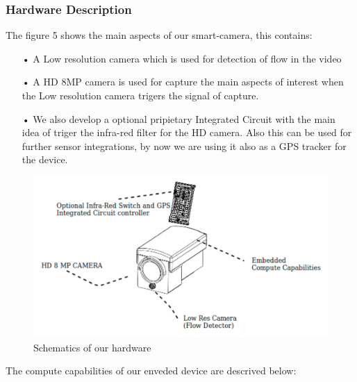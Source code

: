 \subsubsection{Hardware Description}

The figure 5 shows the main aspects of our smart-camera, this contains:
\begin{itemize}
\item[•] A Low resolution camera which is used for detection of flow in the video
\item[•] A HD 8MP camera is used for capture the main aspects of interest when the Low resolution camera trigers the signal of capture. 
\item[•] We also develop a optional pripietary Integrated Circuit with the main idea of triger the infra-red filter for the HD camera. Also this can be used for further sensor integrations, by now we are using it also as a GPS tracker for the device. 
\end{itemize} 

\begin{figure}[H]\centering
	\includegraphics[width=\linewidth]{images/hardware_desc}
	\caption{Schematics of our hardware}
	\label{fig:hardware_dec}
\end{figure}

The compute capabilities of our enveded device are descrived below:

